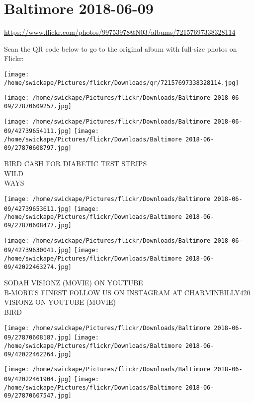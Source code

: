 \documentclass[10pt,letterpaper]{article}
\title{}
\author{}
\date{}
\begin{document}
\section*{Baltimore 2018-06-09}

\url{https://www.flickr.com/photos/99753978@N03/albums/72157697338328114}

Scan the QR code below to go to the original album with full-size photos on Flickr:

\texttt{[image: /home/swickape/Pictures/flickr/Downloads/qr/72157697338328114.jpg]}
\pagebreak

\texttt{[image: /home/swickape/Pictures/flickr/Downloads/Baltimore 2018-06-09/27870609257.jpg]}

\vspace{0.25in}
\texttt{[image: /home/swickape/Pictures/flickr/Downloads/Baltimore 2018-06-09/42739654111.jpg]}
\texttt{[image: /home/swickape/Pictures/flickr/Downloads/Baltimore 2018-06-09/27870608797.jpg]}

BIRD CASH FOR DIABETIC TEST STRIPS\\
WILD\\
WAYS
\pagebreak

\texttt{[image: /home/swickape/Pictures/flickr/Downloads/Baltimore 2018-06-09/42739653611.jpg]}
\texttt{[image: /home/swickape/Pictures/flickr/Downloads/Baltimore 2018-06-09/27870608477.jpg]}

\texttt{[image: /home/swickape/Pictures/flickr/Downloads/Baltimore 2018-06-09/42739630041.jpg]}
\texttt{[image: /home/swickape/Pictures/flickr/Downloads/Baltimore 2018-06-09/42022463274.jpg]}

SODAH VISIONZ (MOVIE) ON YOUTUBE\\
B{-}MORE'S FINEST FOLLOW US ON INSTAGRAM AT CHARMINBILLY420\\
VISIONZ ON YOUTUBE (MOVIE)\\
BIRD
\pagebreak

\texttt{[image: /home/swickape/Pictures/flickr/Downloads/Baltimore 2018-06-09/27870608187.jpg]}
\texttt{[image: /home/swickape/Pictures/flickr/Downloads/Baltimore 2018-06-09/42022462264.jpg]}

\texttt{[image: /home/swickape/Pictures/flickr/Downloads/Baltimore 2018-06-09/42022461904.jpg]}
\texttt{[image: /home/swickape/Pictures/flickr/Downloads/Baltimore 2018-06-09/27870607547.jpg]}
\end{document}
